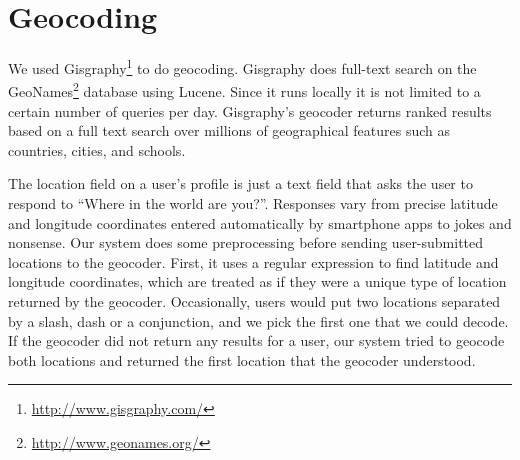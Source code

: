 
\section{Geocoding}
We used Gisgraphy\footnote{\url{http://www.gisgraphy.com/}} to do geocoding.
%
Gisgraphy does full-text search on the
GeoNames\footnote{\url{http://www.geonames.org/}} database using Lucene.
%
Since it runs locally it is not limited to a certain number of queries per day.
%
Gisgraphy's geocoder returns ranked results based on a full text search
over millions of geographical features such as countries, cities, and schools.

The location field on a user's profile is just a text field that asks the user
to respond to ``Where in the world are you?''.
%
Responses vary from precise latitude and longitude coordinates entered
automatically by smartphone apps to jokes and nonsense.
%
Our system does some preprocessing before sending user-submitted locations to
the geocoder.
%
First, it uses a regular expression to find latitude and longitude coordinates,
which are treated as if they were a unique type of location returned by the
geocoder.
%
Occasionally, users would put two locations separated by a slash, dash or a
conjunction, and we pick the first one that we could decode.
%
If the geocoder did not return any results for a user, our system tried to
geocode both locations and returned the first location that the geocoder
understood.

